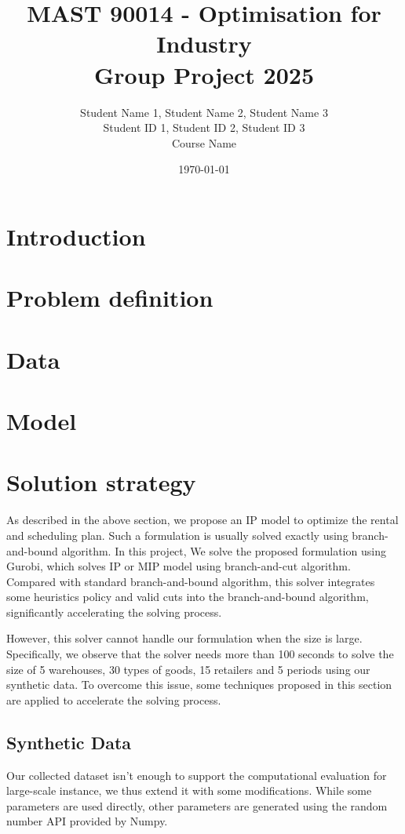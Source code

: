 \documentclass[a4paper,12pt]{article}
\title{MAST 90014 - Optimisation for Industry \\ Group Project 2025}
\author{{Student Name 1}, {Student Name 2}, {Student Name 3} \\
{Student ID 1}, {Student ID 2}, {Student ID 3} \\
Course Name}
\date{\today}
\begin{document}
\maketitle

\section{Introduction}
\section{Problem definition}
\section{Data}
\section{Model}
\section{Solution strategy}

As described in the above section, we propose an IP model to optimize the rental and scheduling plan. Such a formulation is usually solved exactly using branch-and-bound algorithm. In this project, We solve the proposed formulation using Gurobi, which solves IP or MIP model using branch-and-cut algorithm. Compared with standard branch-and-bound algorithm, this solver integrates some heuristics policy and valid cuts into the branch-and-bound algorithm, significantly accelerating the solving process. 

However, this solver cannot handle our formulation when the size is large. Specifically, we observe that the solver needs more than 100 seconds to solve the size of 5 warehouses, 30 types of goods, 15 retailers and 5 periods using our synthetic data. To overcome this issue, some techniques proposed in this section are applied to accelerate the solving process.

\subsection{Synthetic Data}

Our collected dataset isn't enough to support the computational evaluation for large-scale instance, we thus extend it with some modifications. While some parameters are used directly, other parameters are generated using the random number API provided by Numpy. 
\end{document}
